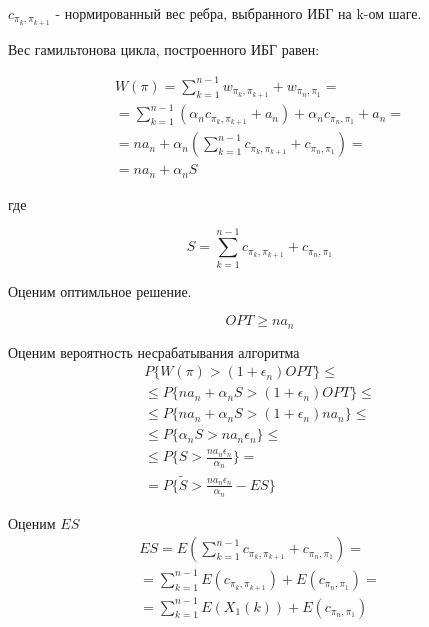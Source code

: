 \documentclass[a4paper, 14pt]{extarticle}
\numberwithin{equation}{section}
\begin{document}
$c_{\pi_k, \pi_{k+1}}$ - нормированный вес ребра, выбранного ИБГ на k-ом шаге.

Вес гамильтонова цикла, построенного ИБГ равен:

\begin{equation}
\begin{aligned}
W(\pi) = \sum_{k=1}^{n-1} w_{\pi_k, \pi_{k+1}} + w_{\pi_n, \pi_{1}} = \\
= \sum_{k=1}^{n-1} (\alpha_n c_{\pi_k, \pi_{k+1}} + a_n) +\alpha_n c_{\pi_n, \pi_{1}} + a_n = \\
= na_n + \alpha_n( \sum_{k=1}^{n-1} c_{\pi_k, \pi_{k+1}} + c_{\pi_n, \pi_1}) = \\
= na_n + \alpha_n S
\end{aligned}
\end{equation}

где

\begin{equation}
S = \sum_{k=1}^{n-1} c_{\pi_k, \pi_{k+1}} + c_{\pi_n, \pi_1}
\end{equation}

Оценим оптимльное решение.

\begin{equation}
OPT \geq na_n
\end{equation}

Оценим вероятность несрабатывания алгоритма
\begin{equation}
\begin{aligned}
P\{ W(\pi)>(1+\epsilon_n)OPT \} \leq \\
\leq P\{na_n + \alpha_n S > (1+\epsilon_n)OPT \} \leq \\ 
\leq P\{na_n + \alpha_n S > (1+\epsilon_n)na_n \} \leq \\
\leq P\{\alpha_n S > na_n\epsilon_n \} \leq \\
\leq P\{S >\frac{na_n\epsilon_n}{\alpha_n}  \} = \\
= P\{\tilde{S} >\frac{na_n\epsilon_n}{\alpha_n} - ES  \}
\end{aligned}
\end{equation}

Оценим $ES$
\begin{equation}
\begin{aligned}
ES = E( \sum_{k=1}^{n-1} c_{\pi_k, \pi_{k+1}} + c_{\pi_n, \pi_1} ) =\\
=  \sum_{k=1}^{n-1} E(c_{\pi_k, \pi_{k+1}}) + E(c_{\pi_n, \pi_1}) = \\
= \sum_{k=1}^{n-1} E(X_1(k)) + E(c_{\pi_n, \pi_1})
\end{aligned}
\end{equation}
\end{document}
